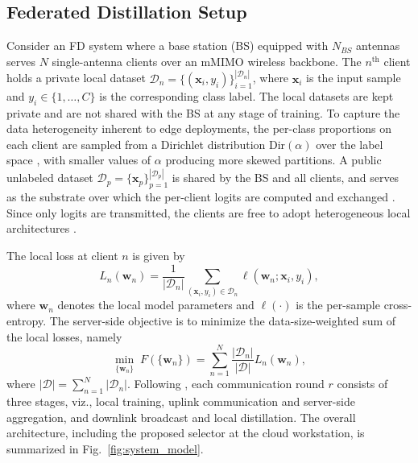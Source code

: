 \documentclass[journal]{IEEEtran}
\begin{document}
\subsection{Federated Distillation Setup}
\label{ssec:fd-setup}

Consider an FD system where a base station (BS) equipped with $N_{BS}$ antennas serves $N$ single-antenna clients over an mMIMO wireless backbone. The $n^{\text{th}}$ client holds a private local dataset $\mathcal{D}_n = \{(\bm{x}_i, y_i)\}_{i=1}^{|\mathcal{D}_n|}$, where $\bm{x}_i$ is the input sample and $y_i \in \{1, \dots, C\}$ is the corresponding class label. The local datasets are kept private and are not shared with the BS at any stage of training. To capture the data heterogeneity inherent to edge deployments, the per-class proportions on each client are sampled from a Dirichlet distribution $\text{Dir}(\alpha)$ over the label space \cite{hsu2019measuring}, with smaller values of $\alpha$ producing more skewed partitions. A public unlabeled dataset $\mathcal{D}_p = \{\bm{x}_p\}_{p=1}^{|\mathcal{D}_p|}$ is shared by the BS and all clients, and serves as the substrate over which the per-client logits are computed and exchanged \cite{itahara2023distillation}. Since only logits are transmitted, the clients are free to adopt heterogeneous local architectures \cite{chan2021fedhe}.

The local loss at client $n$ is given by
\begin{equation}
L_n(\bm{w}_n) = \frac{1}{|\mathcal{D}_n|} \sum_{(\bm{x}_i, y_i) \in \mathcal{D}_n} \ell(\bm{w}_n; \bm{x}_i, y_i),
\label{eq:local_loss}
\end{equation}
where $\bm{w}_n$ denotes the local model parameters and $\ell(\cdot)$ is the per-sample cross-entropy. The server-side objective is to minimize the data-size-weighted sum of the local losses, namely
\begin{equation}
\min_{\{\bm{w}_n\}} \; F\!\left(\{\bm{w}_n\}\right) = \sum_{n=1}^{N} \frac{|\mathcal{D}_n|}{|\mathcal{D}|} L_n(\bm{w}_n),
\label{eq:global_obj}
\end{equation}
where $|\mathcal{D}| = \sum_{n=1}^{N} |\mathcal{D}_n|$. Following \cite{mu2024fedtskd}, each communication round $r$ consists of three stages, viz., local training, uplink communication and server-side aggregation, and downlink broadcast and local distillation. The overall architecture, including the proposed selector at the cloud workstation, is summarized in Fig.~\ref{fig:system_model}.
\end{document}
